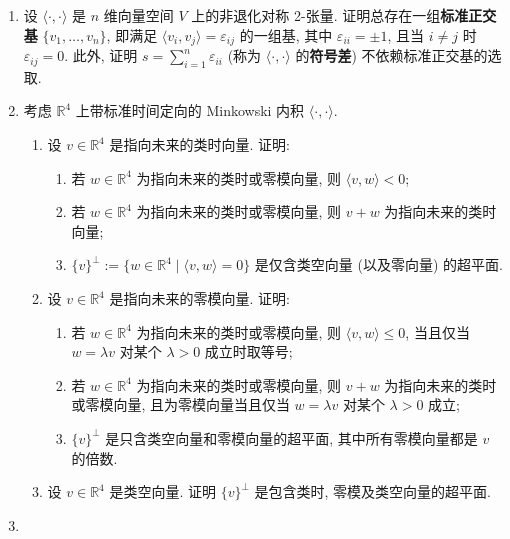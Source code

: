 \begin{RiemannExercise}\label{ex:special-relativity}
\begin{enumerate}[label=(\arabic*),ref=\arabic*,leftmargin=*]
\item\label{ex:signature-of-nondegenerate-symmetric-form}
设 $\langle\cdot,\cdot\rangle$ 是 $n$ 维向量空间 $V$ 上的非退化对称 2-张量. 证明总存在一组\textbf{标准正交基} $\{v_1,\ldots,v_n\}$, 即满足 $\langle v_i,v_j\rangle=\varepsilon_{ij}$ 的一组基, 其中 $\varepsilon_{ii}=\pm1$, 且当 $i\ne j$ 时 $\varepsilon_{ij}=0$. 此外, 证明 $s=\sum_{i=1}^n\varepsilon_{ii}$ (称为 $\langle\cdot,\cdot\rangle$ 的\textbf{符号差}) 不依赖标准正交基的选取.
\item\label{ex:minkowski-orthogonality-and-time-orientation}
考虑 $\mathbb{R}^4$ 上带标准时间定向的 Minkowski 内积 $\langle\cdot,\cdot\rangle$.
\begin{enumerate}[label=(\alph*),leftmargin=*]
\item 设 $v\in\mathbb{R}^4$ 是指向未来的类时向量. 证明:
\begin{enumerate}[label=(\roman*),leftmargin=*]
\item 若 $w\in\mathbb{R}^4$ 为指向未来的类时或零模向量, 则 $\langle v,w\rangle<0$;
\item 若 $w\in\mathbb{R}^4$ 为指向未来的类时或零模向量, 则 $v+w$ 为指向未来的类时向量;
\item $\{v\}^\perp:=\{w\in\mathbb{R}^4\mid\langle v,w\rangle=0\}$ 是仅含类空向量 (以及零向量) 的超平面.
\end{enumerate}
\item 设 $v\in\mathbb{R}^4$ 是指向未来的零模向量. 证明:
\begin{enumerate}[label=(\roman*),leftmargin=*]
\item 若 $w\in\mathbb{R}^4$ 为指向未来的类时或零模向量, 则 $\langle v,w\rangle\leq0$, 当且仅当 $w=\lambda v$ 对某个 $\lambda>0$ 成立时取等号;
\item 若 $w\in\mathbb{R}^4$ 为指向未来的类时或零模向量, 则 $v+w$ 为指向未来的类时或零模向量, 且为零模向量当且仅当 $w=\lambda v$ 对某个 $\lambda>0$ 成立;
\item $\{v\}^\perp$ 是只含类空向量和零模向量的超平面, 其中所有零模向量都是 $v$ 的倍数.
\end{enumerate}
\item 设 $v\in\mathbb{R}^4$ 是类空向量. 证明 $\{v\}^\perp$ 是包含类时, 零模及类空向量的超平面.
\end{enumerate}
\item\label{ex:lorentz-boost-in-two-dimensions}

\end{enumerate}
\end{RiemannExercise}
